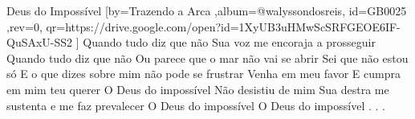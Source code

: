 \beginsong
{Deus do Impossível %
}[by={Trazendo a Arca %
},album={@walyssondosreis},
id={GB0025 %
},rev={0}, %
qr={https://drive.google.com/open?id=1XyUB3uHMwScSRFGEOE6IF-QuSAxU-SS2 %
}]
\beginverse*
Quando tudo diz que não
Sua voz me encoraja a prosseguir
Quando tudo diz que não
Ou parece que o mar não vai se abrir
Sei que não estou só
E o que dizes sobre mim não pode se frustrar
Venha em meu favor
E cumpra em mim teu querer
\endverse
\beginchorus
O Deus do impossível
Não desistiu de mim
Sua destra me sustenta e me faz prevalecer
O Deus do impossível
O Deus do impossível
\endchorus
\beginverse*\color{white}
.
.
.
\endverse

